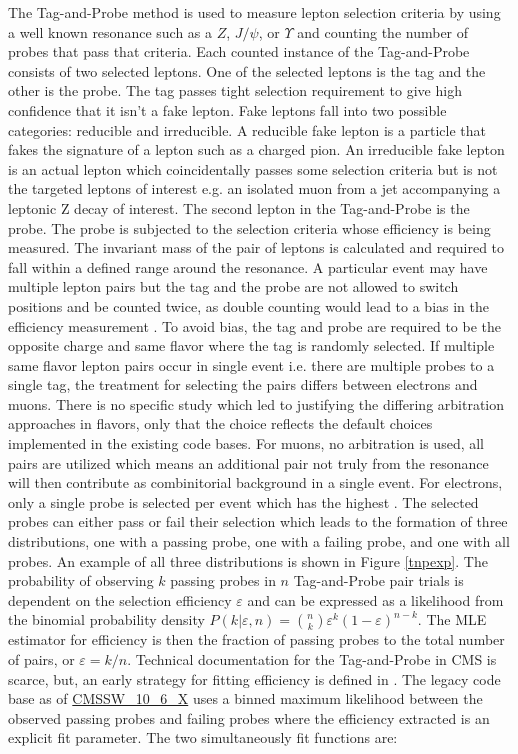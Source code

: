The Tag-and-Probe method is used to measure lepton selection criteria by using a well known resonance such as a $Z$, $J/\psi$, or $\Upsilon$ and counting the number of probes that pass that criteria. Each counted instance of the Tag-and-Probe consists of two selected leptons. One of the selected leptons is the tag and the other is the probe.  The tag passes tight selection requirement to give high confidence that it isn't a fake lepton. Fake leptons fall into two possible categories: reducible and irreducible. A reducible fake lepton is a particle that fakes the signature of a lepton such as a charged pion. An irreducible fake lepton is an actual lepton which coincidentally passes some selection criteria but is not the targeted leptons of interest e.g. an isolated muon from a jet accompanying a leptonic Z decay of interest.  The  second lepton in the Tag-and-Probe is the probe. The probe is subjected to the selection criteria whose efficiency is being measured. The invariant mass of the pair of leptons is calculated and required to fall within a defined range around the resonance. A particular event may have multiple lepton pairs but the tag and the probe are not allowed to switch positions and be counted twice, as double counting would lead to a bias in the efficiency measurement \cite{AN111-2009}. To avoid bias, the tag and probe are required to be the opposite charge and same flavor where the tag is randomly selected. If multiple same flavor lepton pairs occur in single event i.e. there are multiple probes to a single tag, the treatment for selecting the pairs differs between electrons and muons. There is no specific study which led to justifying the differing arbitration approaches in flavors, only that the choice reflects the default choices implemented in the existing code bases.  For muons, no arbitration is used, all pairs are utilized which means an additional pair not truly from the resonance will then contribute as combinitorial background in a single event. For electrons, only a single probe is selected per event which has the highest \pt. The selected probes can either pass or fail their selection which leads to the formation of three distributions, one with a passing probe, one with a failing probe, and one with all probes. An example of all three distributions is shown in Figure \ref{tnpexp}.  The probability of observing $k$ passing probes in $n$ Tag-and-Probe pair trials is dependent on the selection efficiency $\varepsilon$ and can be expressed as a likelihood from the binomial probability density $P(k|\varepsilon,n) = \binom{n}{k}\varepsilon^k(1-\varepsilon)^{n-k}$. The MLE estimator for efficiency is then the fraction of passing probes to the total number of pairs, or $\varepsilon = k/n$. Technical documentation for the Tag-and-Probe in CMS is scarce, but, an early strategy for fitting efficiency is defined in \cite{Berryhill_2010}. The legacy code base as of \url{CMSSW_10_6_X}  uses a binned maximum likelihood between the observed passing probes and failing probes where the efficiency extracted is an explicit fit parameter. The two simultaneously fit functions are:
